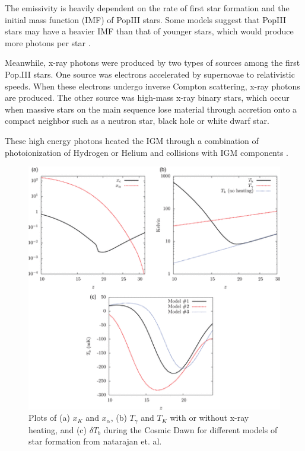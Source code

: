 The emissivity is heavily dependent on the rate of first star formation and the initial mass function (IMF) of PopIII stars. Some models suggest that PopIII stars may have a heavier IMF than that of younger stars, which would produce more \lya  photons per star \cite{natarajan_2014}. 

Meanwhile, x-ray photons were produced by two types of sources among the first Pop.III stars. One source was electrons accelerated by supernovae to relativistic speeds. When these electrons undergo inverse Compton scattering, x-ray photons are produced. The other source was high-mass x-ray binary stars, which occur when massive stars on the main sequence lose material through accretion onto a compact neighbor such as a neutron star, black hole or white dwarf star. 

These high energy photons heated the IGM through a combination of photoionization of Hydrogen or Helium and collisions with IGM components \cite{furlanetto_2006}. 

\begin{figure}[htb]
\begin{center}
\includegraphics[width=0.95\linewidth]{Introduction/figures/ts_evolution.png}
\caption{Plots of (a) $x_K$ and $x_{\alpha}$, (b) $T_\gamma$ and $T_K$ with or without x-ray heating, and (c) $\delta T_b$ during the Cosmic Dawn for different models of star formation from natarajan et. al. \cite{natarajan_2014}}
\label{Fig:cd_global}
\end{center}
\end{figure}

